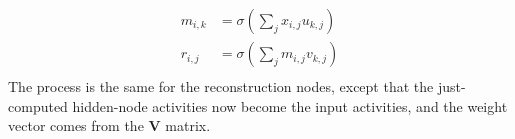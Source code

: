	\begin{align} %
	\label{eq:sig-m-ac}
	m_{i,k} &=\sigma(\sum_{j} x_{i,j} u_{k,j}) \\
	\label{eq:sig-r-ac}
  	r_{i,j} &= \sigma(\sum_{j} m_{i,j} v_{k,j}) \\ 
	\end{align}
%	
The process is the same for the reconstruction nodes, except that the just-computed hidden-node activities now become the input activities, and the weight vector comes from the $\textbf{V}$ matrix.

